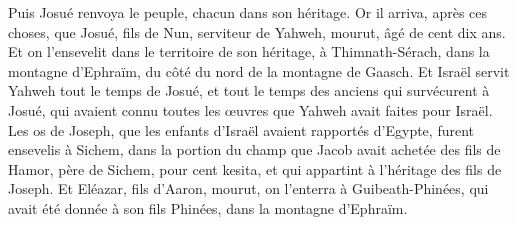 \begin{multicols}{2}
Puis Josué renvoya le peuple, chacun dans son héritage.
Or il arriva, après ces choses, que Josué, fils de Nun, serviteur de Yahweh, mourut, âgé de cent dix ans.
Et on l'ensevelit dans le territoire de son héritage, à Thimnath-Sérach, dans la montagne d'Ephraïm, du côté du nord de la montagne de Gaasch.
Et Israël servit Yahweh tout le temps de Josué, et tout le temps des anciens qui survécurent à Josué, qui avaient connu toutes les œuvres que Yahweh avait faites pour Israël.
Les os de Joseph, que les enfants d'Israël avaient rapportés d'Egypte, furent ensevelis à Sichem, dans la portion du champ que Jacob avait achetée des fils de Hamor, père de Sichem, pour cent kesita, et qui appartint à l'héritage des fils de Joseph.
Et Eléazar, fils d'Aaron, mourut, on l'enterra à Guibeath-Phinées, qui avait été donnée à son fils Phinées, dans la montagne d'Ephraïm.
\PPE{}
\end{multicols}
